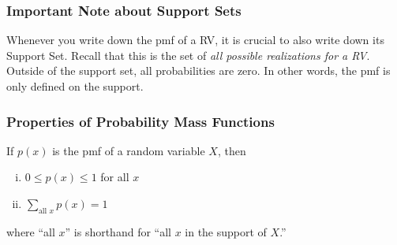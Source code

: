 \documentclass[handout]{beamer}
\begin{document}
\begin{frame}
\frametitle{Important Note about Support Sets}
Whenever you write down the pmf of a RV, it is \alert{crucial} to also write down its Support Set. Recall that this is the set of \alert{\emph{all possible realizations for a RV}}. Outside of the support set, all probabilities are zero. In other words, the pmf is \alert{only defined} on the support.

\end{frame}
\begin{frame}
\frametitle{Properties of Probability Mass Functions}

If $p(x)$ is the pmf of a random variable $X$, then
\begin{enumerate}[(i)]
	\item $0\leq p(x) \leq 1$ for all $x$ \vspace{1em}
	\item $\displaystyle \sum_{\mbox{all } x} p(x) = 1$
\end{enumerate}

\vspace{0.75em}
where ``all $x$'' is shorthand for ``all $x$ in the support of $X$.''

\end{frame}
\end{document}
